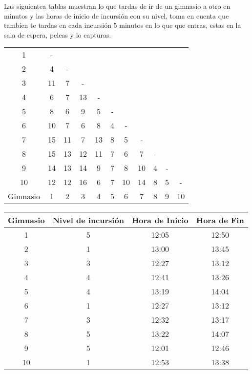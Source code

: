 \documentclass[10pt,letterpaper,twoside,openright]{article}
\begin{document}
	Las siguientea tablas muestran lo que tardas de ir de un gimnasio a otro en minutos y las horas de inicio de incursión con su nivel, toma en cuenta que tambíen te tardas en cada incursión 5 minutos en lo que que entras, estas en la sala de espera, peleas y lo capturas.
	
	\begin{tabular}{c||*{10}{c|}}
  	\cline{1-2}
  	1 & -                     				  		\\ \cline{1-3}
  	2 & 4 & -                                 		\\ \cline{1-4}
  	3 & 11 & 7 & -                             		\\ \cline{1-5}
 	4 & 6 & 7 & 13 & -                        		\\ \cline{1-6}
 	5 & 8 & 6 & 9 & 5 & -                     		\\ \cline{1-7}
 	6 & 10 & 7 & 6 & 8 & 4 & -              		\\ \cline{1-8}
 	7 & 15 & 11 & 7 & 13 & 8 & 5 & -             		\\ \cline{1-9}
  	8 & 15 & 13 & 12 & 11 & 7 & 6 & 7 & -        		\\ \cline{1-10}
  	9 & 14 & 13 & 14 & 9 & 7 & 8 & 10 & 4 & -     		\\ \hline
 	10 & 12 & 12 & 16 & 6 & 7 & 10 & 14 & 8 & 5 & -	\\ \hline \hline
 	Gimnasio & 1 & 2 & 3 & 4 & 5 & 6 & 7 & 8 & 9 & 10		\\
	\end{tabular}
	
	\begin{tabular}{c||ccc}
	\textbf{Gimnasio} & \textbf{Nivel de incursió}n & \textbf{Hora de Inicio} & \textbf{Hora de Fin} \\ 
	\hline 
	\hline
	1 & 5 & 12:05 & 12:50 \\ 
	\hline 
	2 & 1 & 13:00 & 13:45 \\ 
	\hline 
	3 & 3 & 12:27 & 13:12 \\ 
	\hline 
	4 & 4 & 12:41 & 13:26 \\ 
	\hline 
	5 & 4 & 13:19 & 14:04 \\ 
	\hline 
	6 & 1 & 12:27 & 13:12 \\ 
	\hline 
	7 & 3 & 12:32 & 13:17 \\ 
	\hline 
	8 & 5 & 13:22 & 14:07 \\ 
	\hline 
	9 & 5 & 12:01 & 12:46 \\ 
	\hline 
	10 & 1 & 12:53 & 13:38 \\ 
	\hline 
	\end{tabular} 
	
	
		
\end{document}
